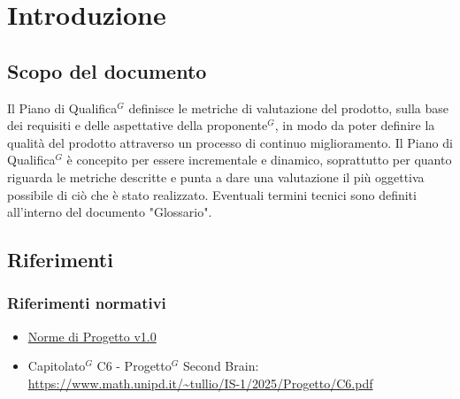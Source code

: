 \documentclass[a4paper,10pt]{article}
\begin{document}
\newpage

\section{Introduzione}
\subsection{Scopo del documento}
Il Piano di Qualifica$^G$ definisce le metriche di valutazione del prodotto, sulla base dei requisiti e delle aspettative della proponente$^G$, in modo da poter definire la qualità del prodotto attraverso un processo di continuo miglioramento.
Il Piano di Qualifica$^G$ è concepito per essere incrementale e dinamico, soprattutto per quanto riguarda le metriche descritte e punta a dare una valutazione il più oggettiva possibile di ciò che è stato realizzato. Eventuali termini tecnici sono definiti all'interno del documento "Glossario".
\subsection{Riferimenti}
\subsubsection{Riferimenti normativi}
\begin{itemize}
    \item \href{https://tool-8.github.io/Documentazione-SWE/}{Norme di Progetto v1.0}
    \item Capitolato$^G$ C6 - Progetto$^G$ Second Brain:    \\ \url{https://www.math.unipd.it/~tullio/IS-1/2025/Progetto/C6.pdf}
\end{itemize}
\end{document}
